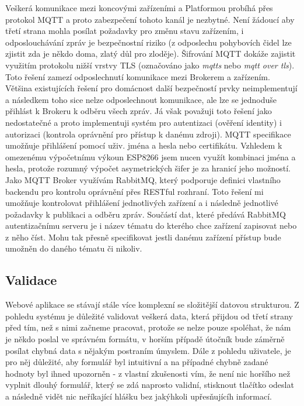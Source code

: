 Veškerá komunikace mezi koncovými zařízeními a Platformou probíhá přes protokol MQTT a proto zabezpečení tohoto kanál je nezbytné. Není žádoucí aby třetí strana mohla posílat požadavky pro změnu stavu zařízením, i odposlouchávání zpráv je bezpečnostní riziko (z odposlechu pohybovích čidel lze zjistit zda je někdo doma, zlatý důl pro zloděje). Šifrování MQTT dokáže zajistit využitím protokolu nižší vrstvy TLS (označováno jako \textit{mqtts} nebo \textit{mqtt over tls}). Toto řešení zamezí odposlechnutí komunikace mezi Brokerem a zařízením. Většina existujících řešení pro domácnost další bezpečností prvky neimplementují a následkem toho sice nelze odposlechnout komunikace, ale lze se jednoduše přihlást k Brokeru k odběru všech zpráv. Já však považuji toto řešení jako nedostatečné a proto implementuji systém pro autentizaci (ověření identity) i autorizaci (kontrola oprávnění pro přístup k danému zdroji). MQTT specifikace umožňuje přihlášení pomocí uživ. jména a hesla nebo certifikátu. Vzhledem k omezenému výpočetnímu výkoun ESP8266 jsem nucen využít kombinaci jména a hesla, protože rozumný výpočet asymetrických šifer je za hranicí jeho možností. Jako MQTT Broker využívám RabbitMQ, který podporuje definici vlastního backendu pro kontrolu oprávnění přes RESTful rozhraní. Toto řešení mi umožňuje kontrolovat přihlášení jednotlivých zařízení a i následně jednotlivé požadavky k publikaci a odběru zpráv. Součástí dat, které předává RabbitMQ autentizačnímu serveru je i název tématu do kterého chce zařízení zapisovat nebo z něho číst. Mohu tak přesně specifikovat jestli danému zařízení přístup bude umožněn do daného tématu či nikoliv.

\subsection{Validace}
\label{BE:Validace}
Webové aplikace se stávají stále více komplexní se složitější datovou strukturou. Z pohledu systému je důležité validovat veškerá data, která přijdou od třetí strany před tím, než s nimi začneme pracovat, protože se nelze pouze spoléhat, že nám je někdo poslal ve správném formátu, v horším případě útočník bude záměrně posílat chybná data s nějakým postraním úmyslem. Dále z pohledu uživatele, je pro něj důležité, aby formulář byl intuitivní a na případné chybně zadané hodnoty byl ihned upozorněn - z vlastní zkušenosti vím, že není nic horšího než vyplnit dlouhý formulář, který se zdá naprosto validní, stisknout tlačítko odeslat a následně vidět nic neříkající hlášku  bez jakýhkoli upřesňujícíh informací.

